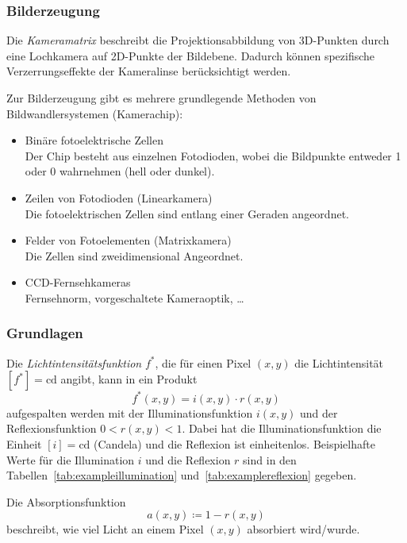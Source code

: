 			\subsubsection{Bilderzeugung}
				Die \emph{Kameramatrix} beschreibt die Projektionsabbildung von 3D-Punkten durch eine Lochkamera auf 2D-Punkte der Bildebene. Dadurch können spezifische Verzerrungseffekte der Kameralinse berücksichtigt werden.
				
				Zur Bilderzeugung gibt es mehrere grundlegende Methoden von Bildwandlersystemen (Kamerachip):
				\begin{itemize}
					\item Binäre fotoelektrische Zellen \\ Der Chip besteht aus einzelnen Fotodioden, wobei die Bildpunkte entweder \num{1} oder \num{0} wahrnehmen (hell oder dunkel).
					\item Zeilen von Fotodioden (Linearkamera) \\ Die fotoelektrischen Zellen sind entlang einer Geraden angeordnet.
					\item Felder von Fotoelementen (Matrixkamera) \\ Die Zellen sind zweidimensional Angeordnet.
					\item CCD-Fernsehkameras \\ Fernsehnorm, vorgeschaltete Kameraoptik, \dots
				\end{itemize}

			\subsubsection{Grundlagen}
				Die \emph{Lichtintensitätsfunktion} \( f^\ast \), die für einen Pixel \( (x, y) \) die Lichtintensität \( [f^\ast] = \si{\candela} \) angibt, kann in ein Produkt
				\begin{equation*}
					f^\ast(x, y) = i(x, y) \cdot r(x, y)
				\end{equation*}
				aufgespalten werden mit der Illuminationsfunktion \( i(x, y) \) und der Reflexionsfunktion \( 0 < r(x, y) < 1 \). Dabei hat die Illuminationsfunktion die Einheit \( [i] = \si{\candela} \) (Candela) und die Reflexion ist einheitenlos. Beispielhafte Werte für die Illumination \(i\) und die Reflexion \(r\) sind in den Tabellen~\ref{tab:exampleillumination} und~\ref{tab:examplereflexion} gegeben.
				
				Die Absorptionsfunktion
				\begin{equation*}
					a(x, y) \coloneqq 1 - r(x, y)
				\end{equation*}
				beschreibt, wie viel Licht an einem Pixel \( (x, y) \) absorbiert wird/wurde.
				
